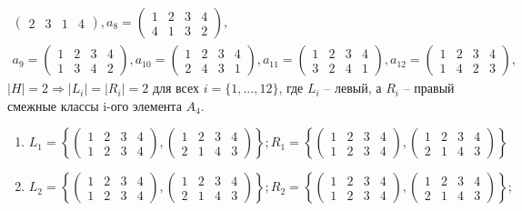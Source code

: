 \documentclass[14pt,a4paper]{scrartcl}
\begin{document}
\begin{spacing}{1}
\begin{gather*}
\begin{pmatrix}
	2 & 3 & 1 & 4
	\end{pmatrix},
	a_8 = \begin{pmatrix}
	1 & 2 & 3 & 4 \\
	4 & 1 & 3 & 2
	\end{pmatrix}, \\
	a_9 = \begin{pmatrix}
	1 & 2 & 3 & 4 \\
	1 & 3 & 4 & 2
	\end{pmatrix},
	a_{10} = \begin{pmatrix}
	1 & 2 & 3 & 4 \\
	2 & 4 & 3 & 1
	\end{pmatrix},
	a_{11} = \begin{pmatrix}
	1 & 2 & 3 & 4 \\
	3 & 2 & 4 & 1
	\end{pmatrix},
	a_{12} = \begin{pmatrix}
	1 & 2 & 3 & 4 \\
	1 & 4 & 2 & 3
	\end{pmatrix},	
	\end{gather*}
	$|H| = 2 \Rightarrow |L_i| = |R_i| = 2$ для всех $i = \{1, ..., 12\}$, где $L_i$ -- левый, а $R_i$ -- правый смежные классы i-ого элемента $A_4$.
	\begin{enumerate}
		\item $L_1 = \left\{ 
		\begin{pmatrix}
		1 & 2 & 3 & 4 \\
		1 & 2 & 3 & 4
		\end{pmatrix},
		\begin{pmatrix}
		1 & 2 & 3 & 4 \\
		2 & 1 & 4 & 3
		\end{pmatrix}
		\right\};
		R_1 = \left\{ 
		\begin{pmatrix}
		1 & 2 & 3 & 4 \\
		1 & 2 & 3 & 4
		\end{pmatrix},
		\begin{pmatrix}
		1 & 2 & 3 & 4 \\
		2 & 1 & 4 & 3
		\end{pmatrix}
		\right\}$
		
		\item $L_2 = \left\{ 
		\begin{pmatrix}
			1 & 2 & 3 & 4 \\
			1 & 2 & 3 & 4
		\end{pmatrix},
		\begin{pmatrix}
			1 & 2 & 3 & 4 \\
			2 & 1 & 4 & 3
		\end{pmatrix}
		\right\};
		R_2 = \left\{ 
		\begin{pmatrix}
			1 & 2 & 3 & 4 \\
			1 & 2 & 3 & 4
		\end{pmatrix},
		\begin{pmatrix}
			1 & 2 & 3 & 4 \\
			2 & 1 & 4 & 3
		\end{pmatrix}
		\right\};$
		

\end{enumerate}
\end{spacing}
\end{document}
